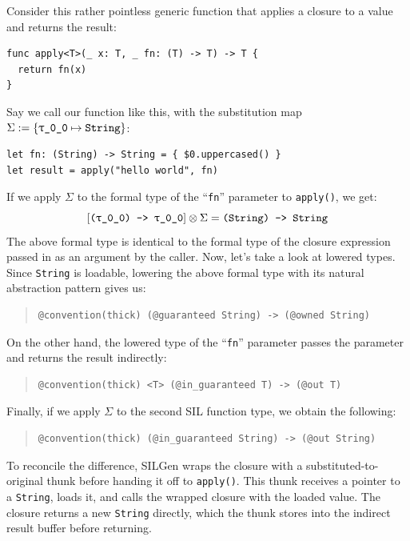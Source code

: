 \documentclass[../generics]{subfiles}
\begin{document}
\begin{example}\label{ex:abstraction pattern 1}
Consider this rather pointless generic function that applies a closure to a value and returns the result:
\begin{Verbatim}
func apply<T>(_ x: T, _ fn: (T) -> T) -> T {
  return fn(x)
}
\end{Verbatim}
Say we call our function like this, with the substitution map $\Sigma := \SubstMap{\SubstType{\rT}{String}}$:
\begin{Verbatim}
let fn: (String) -> String = { $0.uppercased() }
let result = apply("hello world", fn)
\end{Verbatim}
If we apply $\Sigma$ to the formal type of the ``\texttt{fn}'' parameter to \texttt{apply()}, we get:
\[
\left[ \texttt{(\rT) -> \rT} \right] \otimes \Sigma = \texttt{(String) -> String}
\]
The above formal type is identical to the formal type of the closure expression passed in as an argument by the caller. Now, let's take a look at lowered types. Since \texttt{String} is loadable, lowering the above formal type with its natural abstraction pattern gives us:
\begin{quote}
\begin{verbatim}
@convention(thick) (@guaranteed String) -> (@owned String)
\end{verbatim}
\end{quote}
On the other hand, the lowered type of the ``\texttt{fn}'' parameter passes the parameter and returns the result indirectly:
\begin{quote}
\begin{verbatim}
@convention(thick) <T> (@in_guaranteed T) -> (@out T)
\end{verbatim}
\end{quote}
Finally, if we apply $\Sigma$ to the second SIL function type, we obtain the following:
\begin{quote}
\begin{verbatim}
@convention(thick) (@in_guaranteed String) -> (@out String)
\end{verbatim}
\end{quote}
To reconcile the difference, SILGen wraps the closure with a substituted-to-original thunk before handing it off to \texttt{apply()}. This thunk receives a pointer to a \texttt{String}, loads it, and calls the wrapped closure with the loaded value. The closure returns a new \texttt{String} directly, which the thunk stores into the indirect result buffer before returning.
\end{example}
\end{document}

